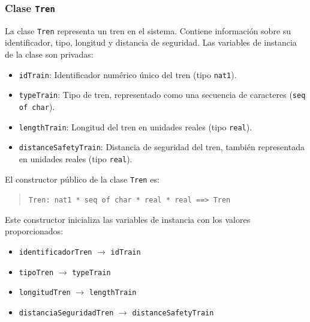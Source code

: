 \documentclass[journal]{IEEEtran}
\begin{document}



    \subsubsection*{Clase \texttt{Tren}}

    La clase \texttt{Tren} representa un tren en el sistema. Contiene información sobre su identificador, tipo, longitud y distancia de seguridad. Las variables de instancia de la clase son privadas:

    \begin{itemize}
    \item \texttt{idTrain}: Identificador numérico único del tren (tipo \texttt{nat1}).
    \item \texttt{typeTrain}: Tipo de tren, representado como una secuencia de caracteres (\texttt{seq of char}).
    \item \texttt{lengthTrain}: Longitud del tren en unidades reales (tipo \texttt{real}).
    \item \texttt{distanceSafetyTrain}: Distancia de seguridad del tren, también representada en unidades reales (tipo \texttt{real}).
    \end{itemize}

    El constructor público de la clase \texttt{Tren} es:

    \begin{quote}
    \texttt{Tren: nat1 * seq of char * real * real \texttt{==>} Tren}
    \end{quote}

    Este constructor inicializa las variables de instancia con los valores proporcionados:

    \begin{itemize}
    \item \texttt{identificadorTren} $\rightarrow$ \texttt{idTrain}
    \item \texttt{tipoTren} $\rightarrow$ \texttt{typeTrain}
    \item \texttt{longitudTren} $\rightarrow$ \texttt{lengthTrain}
    \item \texttt{distanciaSeguridadTren} $\rightarrow$ \texttt{distanceSafetyTrain}
    \end{itemize}




\sloppy

\end{document}
